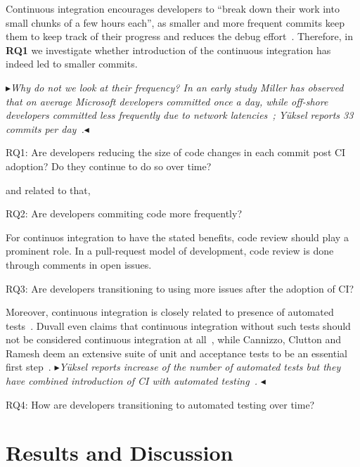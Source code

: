 \documentclass[conference]{IEEEtran}
\newcommand{\nnbb}[2]{
    \fbox{\bfseries\sffamily\scriptsize#1}
    {\sf\small$\blacktriangleright$\textit{#2}$\blacktriangleleft$}
   }
\newcommand{\as}[1]{\nnbb{Alexander}{#1}}
\begin{document}
Continuous integration encourages developers to ``break down their work into small chunks of a few hours each'', as smaller and more frequent commits keep them to keep track of their progress and reduces the debug effort~\cite{Fowler,Duvall}. %
Therefore, in \textbf{RQ1} we investigate whether introduction of the continuous integration has indeed led to smaller commits.
\as{Why do not we look at their frequency? In an early study Miller has observed that on average Microsoft developers committed once a day, while off-shore developers committed less frequently due to network latencies~\cite{Miller}; Y\"{u}ksel reports 33 commits per day~\cite{Yuksel}.}

RQ1: Are developers reducing the size of code changes in each commit post CI adoption? Do they continue to do so over time?

and related to that,

RQ2: Are developers commiting code more frequently?

For continuos integration to have the stated benefits, code review should play a prominent role. In a pull-request model of development, code review is done through comments in open issues.

RQ3: Are developers transitioning to using more issues after the adoption of CI?


Moreover, continuous integration is closely related to presence of automated tests~\cite{Fowler}. Duvall even claims that continuous integration without such tests should not be considered continuous integration at all~\cite{Duvall}, while Cannizzo, Clutton and Ramesh deem an extensive suite of unit and acceptance tests to be an essential first step~\cite{CannizzoCluttonRamesh}. \as{Y\"{u}ksel reports increase of the number of automated tests but they have combined introduction of CI with automated testing~\cite{Yuksel}. }

RQ4: How are developers transitioning to automated testing over time?





\section{Results and Discussion}
\end{document}
